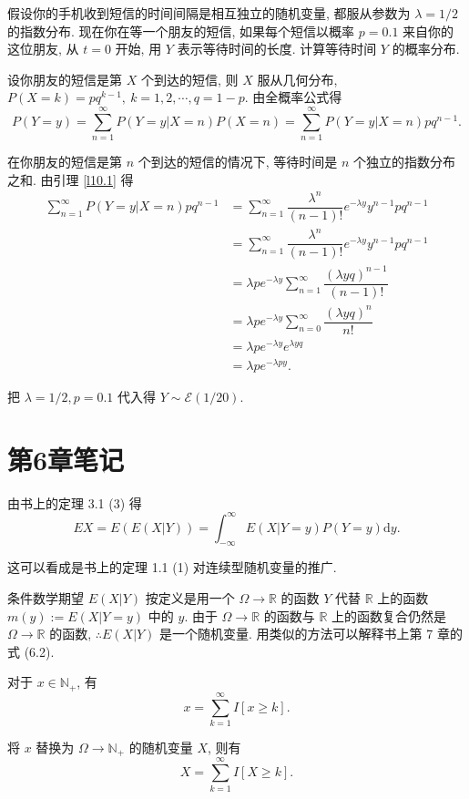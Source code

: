 \documentclass{ctexart}
\begin{document}
\begin{exercise}[a]\label{ex5.36}
    假设你的手机收到短信的时间间隔是相互独立的随机变量, 都服从参数为 $\lambda=1/2$ 的指数分布. 现在你在等一个朋友的短信, 如果每个短信以概率 $p=0.1$ 来自你的这位朋友, 从 $t=0$ 开始, 用 $Y$ 表示等待时间的长度. 计算等待时间 $Y$ 的概率分布.
\end{exercise}
\begin{solution}
    设你朋友的短信是第 $X$ 个到达的短信, 则 $X$ 服从几何分布, $P(X=k)=pq^{k-1},\ k=1,2,\cdots,q=1-p$. 由全概率公式得
    \[P(Y=y)=\sum\limits_{n=1}^\infty P(Y=y|X=n)P(X=n)=\sum\limits_{n=1}^\infty P(Y=y|X=n)pq^{n-1}.\]

    在你朋友的短信是第 $n$ 个到达的短信的情况下, 等待时间是 $n$ 个独立的指数分布之和. 由引理 \ref{l10.1} 得
    \begin{align*}
        \sum\limits_{n=1}^\infty P(Y=y|X=n)pq^{n-1} & =\sum\limits_{n=1}^\infty\dfrac{\lambda^n}{(n-1)!}e^{-\lambda y}y^{n-1}pq^{n-1} \\
        & =\sum\limits_{n=1}^\infty\dfrac{\lambda^n}{(n-1)!}e^{-\lambda y}y^{n-1}pq^{n-1} \\
        & =\lambda pe^{-\lambda y}\sum\limits_{n=1}^\infty\dfrac{(\lambda yq)^{n-1}}{(n-1)!} \\
        & =\lambda pe^{-\lambda y}\sum\limits_{n=0}^\infty\dfrac{(\lambda yq)^n}{n!} \\
        & =\lambda pe^{-\lambda y}e^{\lambda yq} \\
        & =\lambda pe^{-\lambda py}.
    \end{align*}

    把 $\lambda=1/2,p=0.1$ 代入得 $Y\sim\mathcal{E}(1/20)$.
\end{solution}
\section{第6章笔记}
由书上的定理 3.1 (3) 得
\[EX=E(E(X|Y))=\int_{-\infty}^\infty E(X|Y=y)P(Y=y)\mathrm{d}y.\]

这可以看成是书上的定理 1.1 (1) 对连续型随机变量的推广.

条件数学期望 $E(X|Y)$ 按定义是用一个 $\Omega\to\mathbb{R}$ 的函数 $Y$ 代替 $\mathbb{R}$ 上的函数 $m(y):=E(X|Y=y)$ 中的 $y$. 由于 $\Omega\to\mathbb{R}$ 的函数与 $\mathbb{R}$ 上的函数复合仍然是 $\Omega\to\mathbb{R}$ 的函数, $\therefore E(X|Y)$ 是一个随机变量. 用类似的方法可以解释书上第 7 章的式 (6.2).
\begin{example}
    对于 $x\in\mathbb{N}_+$, 有
    \[x=\sum\limits_{k=1}^\infty I[x\geq k].\]

    将 $x$ 替换为 $\Omega\to\mathbb{N}_+$ 的随机变量 $X$, 则有
    \[X=\sum\limits_{k=1}^\infty I[X\geq k].\]
\end{example}
\end{document}
